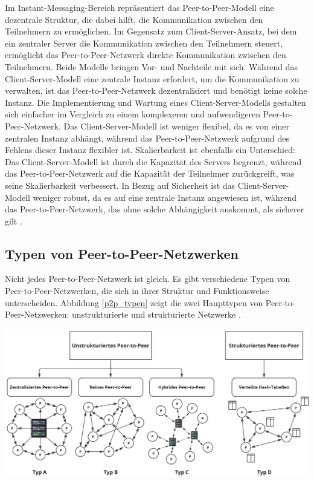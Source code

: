 Im Instant-Messaging-Bereich repräsentiert das Peer-to-Peer-Modell eine dezentrale Struktur, die dabei hilft, die Kommunikation zwischen den Teilnehmern zu ermöglichen. Im Gegensatz zum Client-Server-Ansatz, bei dem ein zentraler Server die Kommunikation zwischen den Teilnehmern steuert, ermöglicht das Peer-to-Peer-Netzwerk direkte Kommunikation zwischen den Teilnehmern. Beide Modelle bringen Vor- und Nachteile mit sich. Während das Client-Server-Modell eine zentrale Instanz erfordert, um die Kommunikation zu verwalten, ist das Peer-to-Peer-Netzwerk dezentralisiert und benötigt keine solche Instanz. Die Implementierung und Wartung eines Client-Server-Modells gestalten sich einfacher im Vergleich zu einem komplexeren und aufwendigeren Peer-to-Peer-Netzwerk. Das Client-Server-Modell ist weniger flexibel, da es von einer zentralen Instanz abhängt, während das Peer-to-Peer-Netzwerk aufgrund des Fehlens dieser Instanz flexibler ist. Skalierbarkeit ist ebenfalls ein Unterschied: Das Client-Server-Modell ist durch die Kapazität des Servers begrenzt, während das Peer-to-Peer-Netzwerk auf die Kapazität der Teilnehmer zurückgreift, was seine Skalierbarkeit verbessert. In Bezug auf Sicherheit ist das Client-Server-Modell weniger robust, da es auf eine zentrale Instanz angewiesen ist, während das Peer-to-Peer-Netzwerk, das ohne solche Abhängigkeit auskommt, als sicherer gilt \parencite[S. 6-8]{Mahlmann_P2PNetzwerke}.


\subsection{Typen von Peer-to-Peer-Netzwerken}

Nicht jedes Peer-to-Peer-Netzwerk ist gleich. Es gibt verschiedene Typen von Peer-to-Peer-Netzwerken, die sich in ihrer Struktur und Funktionsweise unterscheiden. Abbildung \ref{p2p_typen} zeigt die zwei Haupttypen von Peer-to-Peer-Netzwerken: unstrukturierte und strukturierte Netzwerke \parencite[S. 362-363]{Luntovskyy_ModRechnernetze}.

\begin{center}
    \captionsetup{type=figure}
    \includegraphics[width=1\linewidth]{images/p2p_typen.png}
    \label{p2p_typen}
\end{center}

